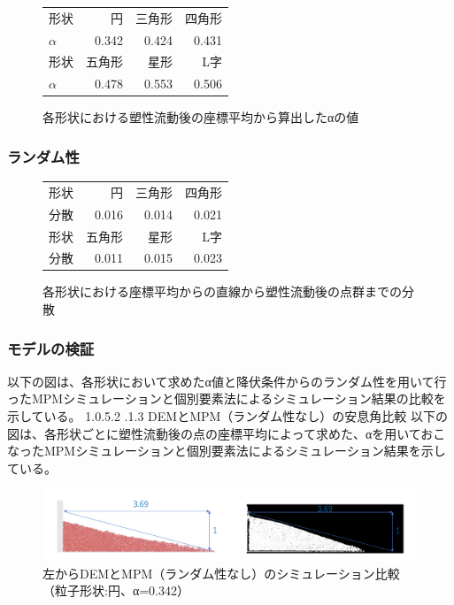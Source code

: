 \documentclass[12pt]{ltjsarticle}
\makeatletter
\renewcommand{\paragraph}{\@startsection{paragraph}{4}{\z@}%
  {1.0\Cvs \@plus.5\Cdp \@minus.2\Cdp}%
  {.1\Cvs \@plus.3\Cdp}%
  {\reset@font\sffamily\normalsize}
}
\makeatother
\begin{document}
\subsubsection{\alpha}
\begin{figure}[htbp]
\centering
  \begin{tabular}{lrrr} \hline
    形状 & 円 & 三角形 & 四角形 \\
    $\alpha$ & 0.342 & 0.424 & 0.431\\ \hline
    形状 & 五角形 & 星形 & L字 \\
    $\alpha$ & 0.478 & 0.553 & 0.506 \\ \hline
  \end{tabular}
  \caption{各形状における塑性流動後の座標平均から算出したαの値}
\end{figure}

\subsubsection{ランダム性}
\begin{figure}[htbp]
\centering
  \begin{tabular}{lrrr} \hline
    形状 & 円 & 三角形 & 四角形 \\
    分散 & 0.016 & 0.014 & 0.021\\ \hline
    形状 & 五角形 & 星形 & L字 \\
    分散 & 0.011 & 0.015  & 0.023 \\ \hline
  \end{tabular}
  \caption{各形状における座標平均からの直線から塑性流動後の点群までの分散}
\end{figure}

\subsubsection{モデルの検証}
以下の図は、各形状において求めたα値と降伏条件からのランダム性を用いて行ったMPMシミュレーションと個別要素法によるシミュレーション結果の比較を示している。
\paragraph{DEMとMPM（ランダム性なし）の安息角比較}
以下の図は、各形状ごとに塑性流動後の点の座標平均によって求めた、αを用いておこなったMPMシミュレーションと個別要素法によるシミュレーション結果を示している。
\begin{figure}[htbp]
  \centering
  \includegraphics*[keepaspectratio, scale=0.4]{circle_ansoku.PNG}
  \caption{左からDEMとMPM（ランダム性なし）のシミュレーション比較（粒子形状:円、α=0.342）}
  \label{hikaku_ansoku_circle}
\end{figure}
\end{document}
